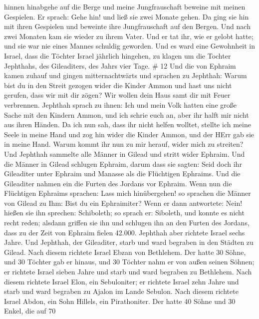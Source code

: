 hinnen hinabgehe auf die Berge und meine Jungfrauschaft beweine mit
meinen Gespielen.  Er sprach: Gehe hin! und ließ sie zwei
Monate gehen. Da ging sie hin mit ihren Gespielen und beweinte ihre
Jungfrauschaft auf den Bergen.  Und nach zwei Monaten kam
sie wieder zu ihrem Vater. Und er tat ihr, wie er gelobt hatte; und sie
war nie eines Mannes schuldig geworden. Und es ward eine Gewohnheit in
Israel,  dass die Töchter Israel jährlich hingehen, zu
klagen um die Tochter Jephthahs, des Gileaditers, des Jahrs vier Tage.
\# 12  Und die von Ephraim kamen zuhauf und gingen
mitternachtwärts und sprachen zu Jephthah: Warum bist du in den Streit
gezogen wider die Kinder Ammon und hast uns nicht gerufen, dass wir mit
dir zögen? Wir wollen dein Haus samt dir mit Feuer verbrennen.
 Jephthah sprach zu ihnen: Ich und mein Volk hatten eine
große Sache mit den Kindern Ammon, und ich schrie euch an, aber ihr
halft mir nicht aus ihren Händen.  Da ich nun sah, dass ihr
nicht helfen wolltet, stellte ich meine Seele in meine Hand und zog hin
wider die Kinder Ammon, und der HErr gab sie in meine Hand. Warum kommt
ihr nun zu mir herauf, wider mich zu streiten?  Und Jephthah
sammelte alle Männer in Gilead und stritt wider Ephraim. Und die Männer
in Gilead schlugen Ephraim, darum dass sie sagten: Seid doch ihr
Gileaditer unter Ephraim und Manasse als die Flüchtigen Ephraims.
 Und die Gileaditer nahmen ein die Furten des Jordans vor
Ephraim. Wenn nun die Flüchtigen Ephraims sprachen: Lass mich
hinübergehen! so sprachen die Männer von Gilead zu Ihm: Bist du ein
Ephraimiter? Wenn er dann antwortete: Nein!  hießen sie ihn
sprechen: Schiboleth; so sprach er: Siboleth, und konnte es nicht recht
reden; alsdann griffen sie ihn und schlugen ihn an den Furten des
Jordans, dass zu der Zeit von Ephraim fielen 42.000. 
Jephthah aber richtete Israel sechs Jahre. Und Jephthah, der Gileaditer,
starb und ward begraben in den Städten zu Gilead.  Nach
diesem richtete Israel Ebzan von Bethlehem.  Der hatte 30
Söhne, und 30 Töchter gab er hinaus, und 30 Töchter nahm er von außen
seinen Söhnen; er richtete Israel sieben Jahre  und starb
und ward begraben zu Bethlehem.  Nach diesem richtete
Israel Elon, ein Sebuloniter; er richtete Israel zehn Jahre
 und starb und ward begraben zu Ajalon im Lande Sebulon.
 Nach diesem richtete Israel Abdon, ein Sohn Hillels, ein
Pirathoniter.  Der hatte 40 Söhne und 30 Enkel, die auf 70
